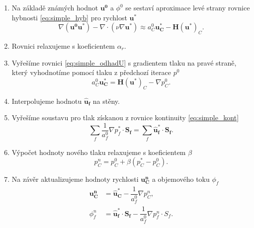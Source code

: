 \begin{enumerate}
	\item Na základě známých hodnot $ \mathbf{u^0} $ a $ \phi^0 $ se sestaví aproximace levé strany rovnice hybnosti \ref{eq:simple_hyb} pro rychlost $ \mathbf{u^*} $
	\begin{equation}\label{key}
	\nabla(\mathbf{u^0}\mathbf{u^*}) - \nabla\cdot(\nu\nabla\mathbf{u^*}) \approx a_C^0 \mathbf{u_C^*} - \mathbf{H}(\mathbf{u^*})_C.
	\end{equation}
	\item Rovnici relaxujeme s koeficientem $ \alpha_r $.
	\item Vyřešíme rovnici \ref{eq:simple_odhadU} s gradientem tlaku na pravé straně, který vyhodnotíme pomocí tlaku z předchozí iterace $ p^0 $
	\begin{equation}\label{key}
	a_C^0\mathbf{u_C^*}
	=
	\mathbf{H}(\mathbf{u^*})_C
	-\nabla p_C^0.
	\end{equation}
	\item Interpolujeme hodnotu $ \mathbf{\widehat{u}_f} $ na stěny.
	\item Vyřešíme soustavu pro tlak získanou z rovnice kontinuity \ref{eq:simple_kont}
	\begin{equation}\label{key}
	\sum_f\dfrac{1}{a_f^0}\nabla p_f^*\cdot \mathbf{S_f}
	=\sum_f \mathbf{\widehat{u}^*_f}\cdot \mathbf{S_f}.
	\end{equation}
	\item Výpočet hodnoty nového tlaku relaxujeme s koeficientem $ \beta $
	\begin{equation}\label{key}
	p_C^n=p_C^0 + \beta (p_C^*-p_C^0).
	\end{equation}
	\item Na závěr aktualizujeme hodnoty rychlosti $ \mathbf{u^n_C} $ a objemového toku $ \phi_f $
	\begin{align}
	\mathbf{u_C^n}&=\mathbf{\widehat{u}^*_C}-\dfrac{1}{a_f^0}\nabla p_C^n, \\
	\phi_f^n&=\mathbf{\widehat{u}^*_f}\cdot \mathbf{S_f}-\dfrac{1}{a_f^0}\nabla p_f^n\cdot S_f.
	\end{align}
\end{enumerate}
\newpage

